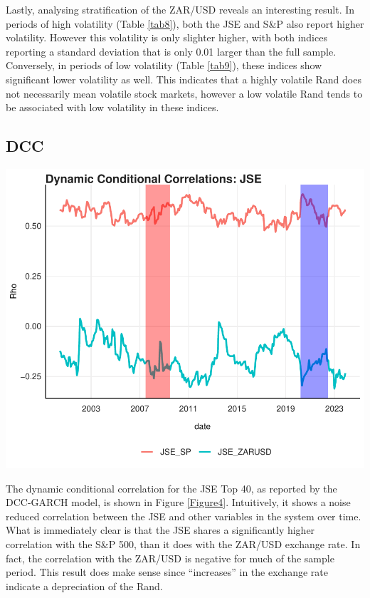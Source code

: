\documentclass[11pt,preprint, authoryear]{elsarticle}
\let\origfigure\figure
\let\endorigfigure\endfigure
\renewenvironment{figure}[1][2] {
    \expandafter\origfigure\expandafter[H]
} {
    \endorigfigure
}
\numberwithin{equation}{section}
\numberwithin{figure}{section}
\numberwithin{table}{section}
\begin{document}
Lastly, analysing stratification of the ZAR/USD reveals an interesting
result. In periods of high volatility (Table \ref{tab8}), both the JSE
and S\&P also report higher volatility. However this volatility is only
slighter higher, with both indices reporting a standard deviation that
is only 0.01 larger than the full sample. Conversely, in periods of low
volatility (Table \ref{tab9}), these indices show significant lower
volatility as well. This indicates that a highly volatile Rand does not
necessarily mean volatile stock markets, however a low volatile Rand
tends to be associated with low volatility in these indices.

\hypertarget{dcc}{%
\subsection{DCC}\label{dcc}}

\begin{figure}[H]

{\centering \includegraphics{FormalWriteUp_files/figure-latex/Figure4-1} 

}

\caption{DCC GARCH \label{Figure4}}\label{fig:Figure4}
\end{figure}

The dynamic conditional correlation for the JSE Top 40, as reported by
the DCC-GARCH model, is shown in Figure \ref{Figure4}. Intuitively, it
shows a noise reduced correlation between the JSE and other variables in
the system over time. What is immediately clear is that the JSE shares a
significantly higher correlation with the S\&P 500, than it does with
the ZAR/USD exchange rate. In fact, the correlation with the ZAR/USD is
negative for much of the sample period. This result does make sense
since ``increases'' in the exchange rate indicate a depreciation of the
Rand.
\end{document}
